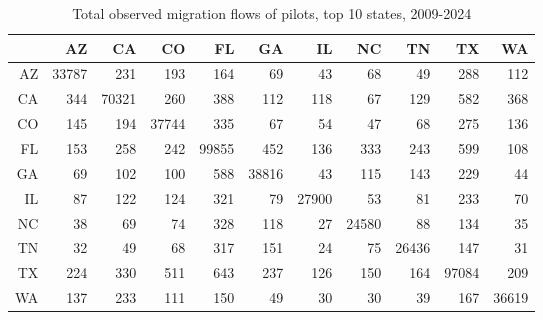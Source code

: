 \begin{table}[ht]
\centering
\begin{tabular}{rrrrrrrrrrr}
  \hline
 & AZ & CA & CO & FL & GA & IL & NC & TN & TX & WA \\ 
  \hline
AZ & 33787 & 231 & 193 & 164 &  69 &  43 &  68 &  49 & 288 & 112 \\ 
  CA & 344 & 70321 & 260 & 388 & 112 & 118 &  67 & 129 & 582 & 368 \\ 
  CO & 145 & 194 & 37744 & 335 &  67 &  54 &  47 &  68 & 275 & 136 \\ 
  FL & 153 & 258 & 242 & 99855 & 452 & 136 & 333 & 243 & 599 & 108 \\ 
  GA &  69 & 102 & 100 & 588 & 38816 &  43 & 115 & 143 & 229 &  44 \\ 
  IL &  87 & 122 & 124 & 321 &  79 & 27900 &  53 &  81 & 233 &  70 \\ 
  NC &  38 &  69 &  74 & 328 & 118 &  27 & 24580 &  88 & 134 &  35 \\ 
  TN &  32 &  49 &  68 & 317 & 151 &  24 &  75 & 26436 & 147 &  31 \\ 
  TX & 224 & 330 & 511 & 643 & 237 & 126 & 150 & 164 & 97084 & 209 \\ 
  WA & 137 & 233 & 111 & 150 &  49 &  30 &  30 &  39 & 167 & 36619 \\ 
   \hline
\end{tabular}
\caption{Total observed migration flows of pilots, top 10 states, 2009-2024} 
\end{table}
